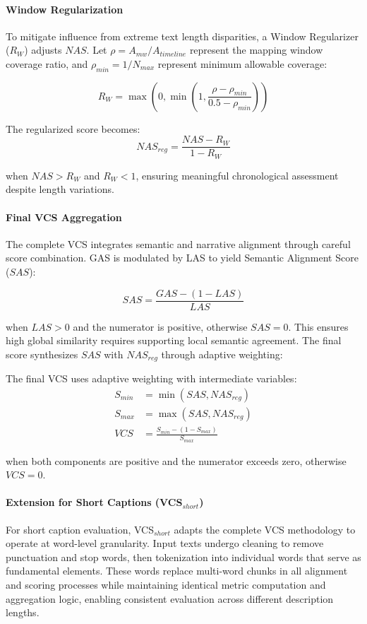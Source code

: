 \documentclass[letterpaper]{article} %
\begin{document}
\paragraph{Window Regularization}
To mitigate influence from extreme text length disparities, a Window Regularizer ($R_W$) adjusts $NAS$. Let $\rho = A_{mw} / A_{timeline}$ represent the mapping window coverage ratio, and $\rho_{min} = 1/N_{max}$ represent minimum allowable coverage:

\begin{equation}
R_W = \max\left(0, \min\left(1, \frac{\rho - \rho_{min}}{0.5 - \rho_{min}}\right)\right)
\end{equation}

The regularized score becomes:
\begin{equation}
NAS_{reg} = \frac{NAS - R_W}{1 - R_W}
\end{equation}

when $NAS > R_W$ and $R_W < 1$, ensuring meaningful chronological assessment despite length variations.

\paragraph{Final VCS Aggregation}
The complete VCS integrates semantic and narrative alignment through careful score combination. GAS is modulated by LAS to yield Semantic Alignment Score ($SAS$):

\begin{equation} \label{eq:sas_revised} 
SAS = \frac{GAS - (1 - LAS)}{LAS}
\end{equation}

when $LAS > 0$ and the numerator is positive, otherwise $SAS = 0$. This ensures high global similarity requires supporting local semantic agreement. The final score synthesizes $SAS$ with $NAS_{reg}$ through adaptive weighting:

The final VCS uses adaptive weighting with intermediate variables:
\begin{align}
S_{min} &= \min(SAS, NAS_{reg}) \label{eq:s_min} \\
S_{max} &= \max(SAS, NAS_{reg}) \label{eq:s_max} \\
VCS &= \frac{S_{min} - (1 - S_{max})}{S_{max}} \label{eq:vcs_final}
\end{align}

when both components are positive and the numerator exceeds zero, otherwise $VCS = 0$.

\paragraph{Extension for Short Captions (VCS$_{short}$)}
For short caption evaluation, VCS$_{short}$ adapts the complete VCS methodology to operate at word-level granularity. Input texts undergo cleaning to remove punctuation and stop words, then tokenization into individual words that serve as fundamental elements. These words replace multi-word chunks in all alignment and scoring processes while maintaining identical metric computation and aggregation logic, enabling consistent evaluation across different description lengths.
\end{document}
